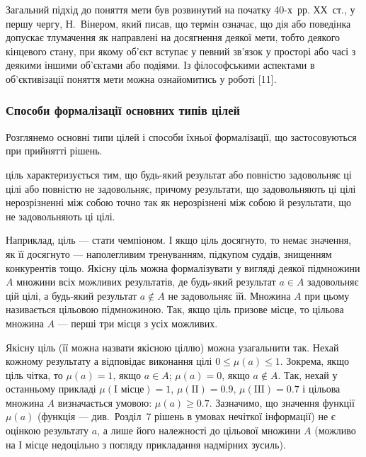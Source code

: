 \documentclass[a4paper, 12pt]{article}
\begin{document}
Загальний підхід до поняття мети був розвинутий на початку 40-х~рр. ХХ~ст., у першу чергу, Н.~Вінером, який писав, що термін \guillemotright означає, що дія або поведінка допускає тлумачення як направлені на досягнення деякої мети, тобто деякого кінцевого стану, при якому об'єкт вступає у певний зв'язок у просторі або часі з деякими іншими об'єктами або подіями. Із філософськими аспектами в об'єктивізації поняття мети можна ознайомитись у роботі [11].

\subsubsection{Способи формалізації основних типів цілей}

Розглянемо основні типи цілей і способи їхньої формалізації, що застосовуються при прийнятті рішень. \medskip

\begin{definition}
	\textit{\guillemotright} ціль характеризується тим, що будь-який результат або повністю задовольняє ці цілі або повністю не задовольняє, причому результати, що задовольняють ці цілі нерозрізненні між собою точно так як нерозрізнені між собою й результати, що не задовольняють ці цілі.
\end{definition}

Наприклад, ціль --- стати чемпіоном. І якщо ціль досягнуто, то немає значення, як її досягнуто --- наполегливим тренуванням, підкупом суддів, знищенням конкурентів тощо. Якісну ціль можна формалізувати у вигляді деякої підмножини $A$ множини всіх можливих результатів, де будь-який результат $a \in A$ задовольняє цій цілі, а будь-який результат $a \notin A$ не задовольняє їй. Множина $A$ при цьому називається цільовою підмножиною. Так, якщо ціль  призове місце\guillemotright, то цільова множина $A$ --- перші три місця з усіх можливих. \medskip

Якісну ціль (її можна назвати якісною \guillemotright ціллю) можна узагальнити так. Нехай кожному результату а відповідає \guillemotright виконання цілі $0 \le \mu(a) \le 1$. Зокрема, якщо ціль чітка, то $\mu(a) = 1$, якщо $a \in A$; $\mu(a) = 0$, якщо $a \notin A$. Так, нехай у останньому прикладі $\mu(\text{I місце}) = 1$, $\mu(\text{II}) = 0.9$, $\mu(\text{III}) = 0.7$ і \guillemotright цільова множина $A$ визначається умовою: $\mu(a) \ge 0.7$. Зазначимо, що значення функції $\mu(a)$ (функція \guillemotright --- див.~Розділ~7  рішень в умовах нечіткої інформації\guillemotright) не є оцінкою результату $a$, а лише \guillemotright його належності до цільової множини $A$ (можливо \guillemotright на І місце недоцільно з погляду прикладання надмірних зусиль).
\end{document}
